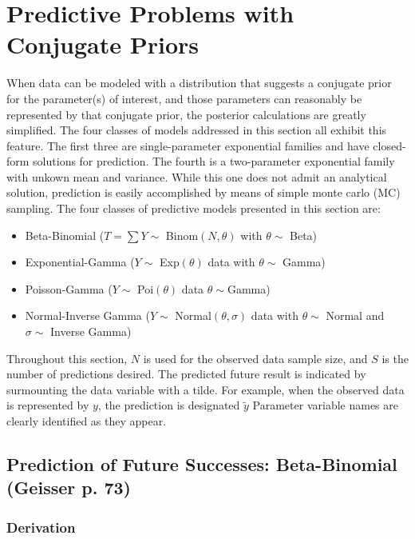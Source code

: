 \documentclass[12pt, a4paper]{article}
\begin{document}
\section{Predictive Problems with Conjugate Priors}

\noindent When data can be modeled with a distribution that suggests a conjugate prior for the parameter(s) of interest, and those parameters can reasonably be represented by that conjugate prior, the posterior calculations are greatly simplified.  The four classes of models addressed in this section all exhibit this feature.  The first three are single-parameter exponential families and have closed-form solutions for prediction.  The fourth is a two-parameter exponential family with unkown mean and variance.  While this one does not admit an analytical solution, prediction is easily accomplished by means of simple monte carlo (MC) sampling.  The four classes of predictive models presented in this section are:
\begin{itemize}
  \item Beta-Binomial ($T = \sum Y\sim$ Binom$(N,\theta)$ with $\theta\sim$ Beta)
  \item Exponential-Gamma ($Y\sim$ Exp$(\theta)$ data with $\theta\sim$ Gamma)
  \item Poisson-Gamma ($Y\sim$ Poi$(\theta)$ data $\theta\sim$Gamma)
  \item Normal-Inverse Gamma ($Y\sim$ Normal$(\theta,\sigma)$ data with $\theta\sim$ Normal and $\sigma\sim$ Inverse Gamma)
\end{itemize}

\noindent Throughout this section, $N$ is used for the observed data sample size, and $S$ is the number of predictions desired. The predicted future result is indicated by surmounting the data variable with a tilde.  For example, when the observed data is represented by $y$, the prediction is designated $\tilde{y}$  Parameter variable names are clearly identified as they appear.

  \subsection{Prediction of Future Successes:  Beta-Binomial (Geisser p. 73)}

    \subsubsection{Derivation}
\end{document}
